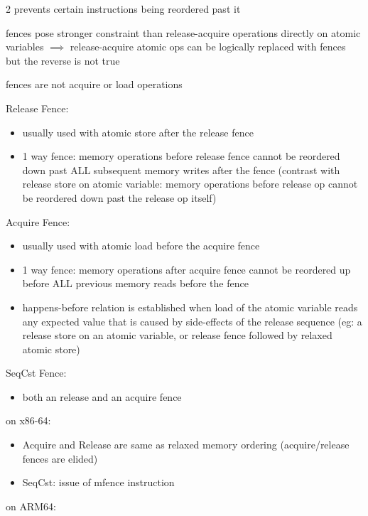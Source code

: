 \documentclass[8pt]{extarticle}
\begin{document}
\begin{multicols*}{2}
    prevents certain instructions being reordered past it

    fences pose stronger constraint than release-acquire operations directly on atomic variables $\implies$ release-acquire atomic ops can be logically replaced with fences but the reverse is not true

    fences are not acquire or load operations

    Release Fence:
    \begin{itemize}
    \item usually used with atomic store after the release fence
    \item 1 way fence: memory operations before release fence cannot be reordered down past ALL subsequent memory writes after the fence (contrast with release store on atomic variable: memory operations before release op cannot be reordered down past the release op itself)
    \end{itemize}

    Acquire Fence: 
    \begin{itemize}
    \item usually used with atomic load before the acquire fence
    \item 1 way fence: memory operations after acquire fence cannot be reordered up before ALL previous memory reads before the fence
    \item happens-before relation is established when load of the atomic variable reads any expected value that is caused by side-effects of the release sequence (eg: a release store on an atomic variable, or release fence followed by relaxed atomic store)
    \end{itemize}

    SeqCst Fence:
    \begin{itemize}
      \item both an release and an acquire fence
    \end{itemize}  

    on x86-64:
    \begin{itemize}
    \item Acquire and Release are same as relaxed memory ordering (acquire/release fences are elided)
    \item SeqCst: issue of mfence instruction
    \end{itemize}
  
    on ARM64:


\end{multicols*}
\end{document}
